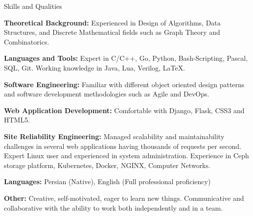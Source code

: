 \documentclass{resume} %
\begin{document}
\begin{rSection}{Skills and Qualities}
	
	{\bf Theoretical Background:}
	Experienced in Design of Algorithms, Data Structures, and Discrete Mathematical fields such as Graph Theory and Combinatorics.
	
	{\bf Languages and Tools:}
	Expert in C/C++, Go, Python, Bash-Scripting, Pascal, SQL, Git. Working knowledge in Java, Lua, Verilog, \LaTeX.
	
	{\bf Software Engineering:}
	Familiar with different object oriented design patterns and software development methodologies such as Agile and DevOps.
	
	{\bf Web Application Development:}
	Comfortable with Django, Flask, CSS3 and HTML5.
	
	{\bf Site Reliability Engineering:}
	Managed scalability and maintainability challenges in several web applications having thousands of requests per second.
	Expert Linux user and experienced in system administration.
	Experience in Ceph storage platform, Kubernetes, Docker, NGINX, Computer Networks.
	
	{\bf Languages:}
	Persian (Native), English (Full professional proficiency)

	{\bf Other:}
	Creative, self-motivated, eager to learn new things. Communicative and collaborative with the ability to work both independently and in a team.
	
\end{rSection}
	
\end{document}
